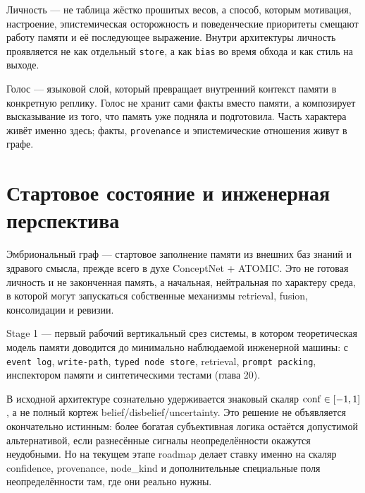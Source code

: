 \begin{definition}[Личность]
Личность --- не таблица жёстко прошитых весов, а способ, которым мотивация,
настроение, эпистемическая осторожность и поведенческие приоритеты смещают
работу памяти и её последующее выражение. Внутри архитектуры личность
проявляется не как отдельный \texttt{store}, а как \texttt{bias} во время обхода
и как стиль на выходе.
\end{definition}

\begin{definition}[Голос]
Голос --- языковой слой, который превращает внутренний контекст памяти в
конкретную реплику. Голос не хранит сами факты вместо памяти, а композирует
высказывание из того, что память уже подняла и подготовила. Часть характера
живёт именно здесь; факты, \texttt{provenance} и эпистемические отношения
живут в графе.
\end{definition}

\section{Стартовое состояние и инженерная перспектива}

\begin{definition}
Эмбриональный граф --- стартовое заполнение памяти из внешних баз знаний и
здравого смысла, прежде всего в духе ConceptNet + ATOMIC. Это не готовая
личность и не законченная память, а начальная, нейтральная по характеру среда,
в которой могут запускаться собственные механизмы retrieval, fusion,
консолидации и ревизии.
\end{definition}

\begin{definition}[Stage 1]
Stage 1 --- первый рабочий вертикальный срез системы, в котором теоретическая
модель памяти доводится до минимально наблюдаемой инженерной машины: с
\texttt{event log}, \texttt{write-path}, \texttt{typed node store}, retrieval,
\texttt{prompt packing}, инспектором памяти и синтетическими тестами
(глава 20).
\end{definition}

\begin{pitfall}
В исходной архитектуре сознательно удерживается знаковый скаляр
$\mathrm{conf} \in [-1, 1]$, а не полный кортеж belief/disbelief/uncertainty. Это
решение не объявляется окончательно истинным: более богатая субъективная
логика остаётся допустимой альтернативой, если разнесённые сигналы
неопределённости окажутся неудобными. Но на текущем этапе roadmap делает
ставку именно на скаляр confidence, provenance, node\_kind и дополнительные
специальные поля неопределённости там, где они реально нужны.
\end{pitfall}

